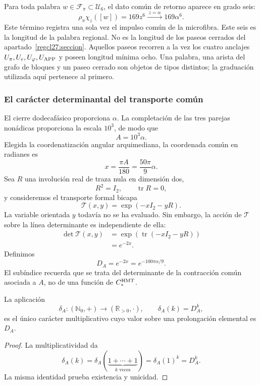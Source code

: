 Para toda palabra \(w\in\mathcal F_\pi\subset\mathcal U_6\), el dato
común de retorno aparece en grado seis:
\[
\rho_\pi\chi_z([w])=169z^6
\xrightarrow{\;z=\alpha\;}169\alpha^6.
\]
Este término registra una sola vez el impulso común de la microfibra.
Este seis es la longitud de la palabra regional. No es la longitud de los
paseos cerrados del apartado~\ref{regcl27:seccion}. Aquellos paseos recorren a
la vez los cuatro anclajes
\(U_\pi,U_e,U_\varphi,U_{\rm APP}\) y poseen longitud mínima ocho. Una
palabra, una arista del grafo de bloques y un paseo cerrado son objetos de
tipos distintos; la graduación utilizada aquí pertenece al primero.

\subsubsection{El carácter determinantal del transporte común}

El cierre dodecafásico proporciona \(\alpha\). La completación de las tres
parejas nonádicas proporciona la escala \(10^3\), de modo que
\[
A=10^3\alpha.
\]
Elegida la coordenatización angular arquimediana, la coordenada común en radianes es
\[
x=\frac{\pi A}{180}=\frac{50\pi}{9}\alpha.
\]
Sea \(R\) una involución real de traza nula en dimensión dos,
\[
R^2=I_2,
\qquad
\operatorname{tr}R=0,
\]
y consideremos el transporte formal bicapa
\[
\mathcal T(x,y)=\exp(-xI_2-yR).
\]
La variable orientada \(y\) todavía no se ha evaluado. Sin embargo, la acción
de \(\mathcal T\) sobre la línea determinante es independiente de ella:
\[
\begin{aligned}
\det\mathcal T(x,y)
&=\exp\!\left(\operatorname{tr}(-xI_2-yR)\right)\\
&=e^{-2x}.
\end{aligned}
\]
Definimos
\[
\boxed{
D_A=e^{-2x}=e^{-100\pi\alpha/9}.}
\]
El subíndice recuerda que se trata del determinante de la contracción común
asociada a \(A\), no de una función de \(C_*^{\rm HMT}\).

\begin{proposition}
\label{p12-83-c13-s3:prop:caracter-determinante}
La aplicación
\[
\delta_A:(\mathbb N_0,+)\longrightarrow(\mathbb R_{>0},\cdot),
\qquad
\delta_A(k)=D_A^k,
\]
es el único carácter multiplicativo cuyo valor sobre una prolongación
elemental es \(D_A\).
\end{proposition}

\begin{proof}
La multiplicatividad da
\[
\delta_A(k)
=\delta_A(\underbrace{1+\cdots+1}_{k\text{ veces}})
=\delta_A(1)^k=D_A^k.
\]
La misma identidad prueba existencia y unicidad.
\end{proof}

